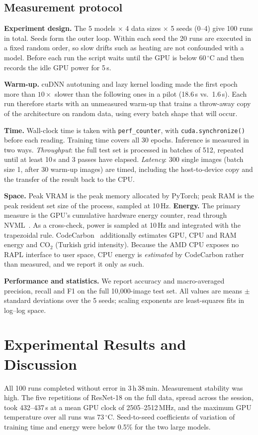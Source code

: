 \documentclass[conference]{IEEEtran}
\begin{document}
\subsection{Measurement protocol}
\textbf{Experiment design.} The 5 models $\times$ 4 data sizes $\times$ 5 seeds (0--4) give 100 runs in total. Seeds form the outer loop. Within each seed the 20 runs are executed in a fixed random order, so slow drifts such as heating are not confounded with a model. Before each run the script waits until the GPU is below 60\,$^\circ$C and then records the idle GPU power for 5\,s.

\textbf{Warm-up.} cuDNN autotuning and lazy kernel loading made the first epoch more than $10\times$ slower than the following ones in a pilot (18.6\,s vs.\ 1.6\,s). Each run therefore starts with an unmeasured warm-up that trains a throw-away copy of the architecture on random data, using every batch shape that will occur.

\textbf{Time.} Wall-clock time is taken with \texttt{perf\_counter}, with \texttt{cuda.synchronize()} before each reading. Training time covers all 30 epochs. Inference is measured in two ways. \emph{Throughput}: the full test set is processed in batches of 512, repeated until at least 10\,s and 3 passes have elapsed. \emph{Latency}: 300 single images (batch size 1, after 30 warm-up images) are timed, including the host-to-device copy and the transfer of the result back to the CPU.

\textbf{Space.} Peak VRAM is the peak memory allocated by PyTorch; peak RAM is the peak resident set size of the process, sampled at 10\,Hz. \textbf{Energy.} The primary measure is the GPU's cumulative hardware energy counter, read through NVML~\cite{nvml}. As a cross-check, power is sampled at 10\,Hz and integrated with the trapezoidal rule. CodeCarbon~\cite{codecarbon} additionally estimates GPU, CPU and RAM energy and CO$_2$ (Turkish grid intensity). Because the AMD CPU exposes no RAPL interface to user space, CPU energy is \emph{estimated} by CodeCarbon rather than measured, and we report it only as such.

\textbf{Performance and statistics.} We report accuracy and macro-averaged precision, recall and F1 on the full 10{,}000-image test set. All values are means $\pm$ standard deviations over the 5 seeds; scaling exponents are least-squares fits in log--log space.

\section{Experimental Results and Discussion}
All 100 runs completed without error in 3\,h\,38\,min. Measurement stability was high. The five repetitions of ResNet-18 on the full data, spread across the session, took 432--437\,s at a mean GPU clock of 2505--2512\,MHz, and the maximum GPU temperature over all runs was 73\,$^\circ$C. Seed-to-seed coefficients of variation of training time and energy were below 0.5\% for the two large models.
\end{document}
